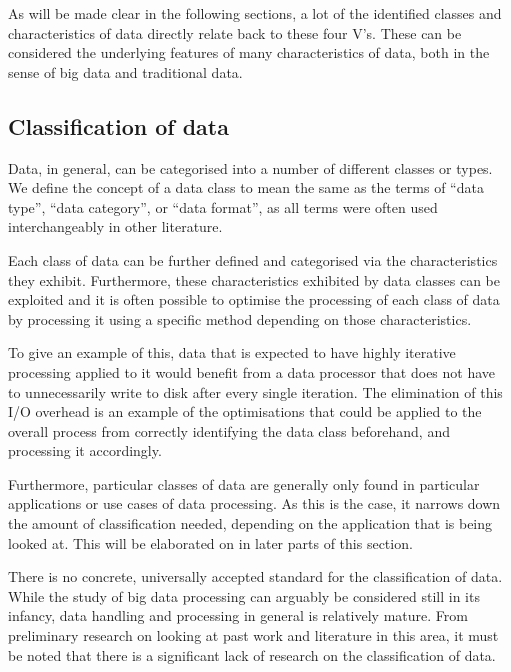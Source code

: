 \documentclass[a4paper,11pt]{article}
\begin{document}
As will be made clear in the following sections, a lot of the identified classes and characteristics of data directly
relate back to these four V's. These can be considered the underlying features of many characteristics of data, both in
the sense of big data and traditional data.



\subsection{Classification of data} %
\label{sub:data_classification}

Data, in general, can be categorised into a number of different classes or types. We define the concept of a data class
to mean the same as the terms of ``data type'', ``data category'', or ``data format'', as all terms were often used
interchangeably in other literature.

Each class of data can be further defined and categorised via the characteristics they exhibit. Furthermore, these
characteristics exhibited by data classes can be exploited and it is often possible to optimise the processing of each
class of data by processing it using a specific method depending on those characteristics.

To give an example of this, data that is expected to have highly iterative processing applied to it would benefit from a
data processor that does not have to unnecessarily write to disk after every single iteration. The elimination of this
I/O overhead is an example of the optimisations that could be applied to the overall process from correctly identifying
the data class beforehand, and processing it accordingly.

Furthermore, particular classes of data are generally only found in particular applications or use cases of data
processing. As this is the case, it narrows down the amount of classification needed, depending on the application that
is being looked at. This will be elaborated on in later parts of this section.

There is no concrete, universally accepted standard for the classification of data. While the study of big data
processing can arguably be considered still in its infancy, data handling and processing in general is relatively
mature. From preliminary research on looking at past work and literature in this area, it must be noted that there is a
significant lack of research on the classification of data.
\end{document}
